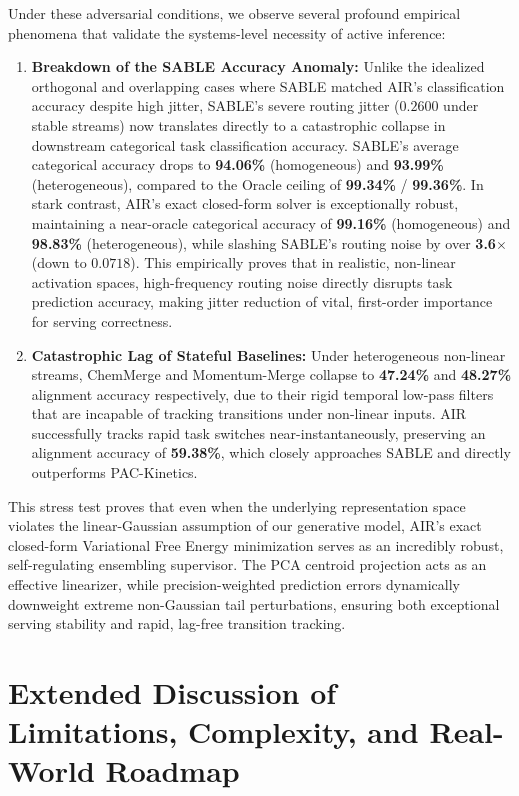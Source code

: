 \documentclass{article}
\theoremstyle{plain}
\theoremstyle{definition}
\theoremstyle{remark}
\begin{document}
Under these adversarial conditions, we observe several profound empirical phenomena that validate the systems-level necessity of active inference:
\begin{enumerate}
    \item \textbf{Breakdown of the SABLE Accuracy Anomaly:} Unlike the idealized orthogonal and overlapping cases where SABLE matched AIR's classification accuracy despite high jitter, SABLE's severe routing jitter ($0.2600$ under stable streams) now translates directly to a catastrophic collapse in downstream categorical task classification accuracy. SABLE's average categorical accuracy drops to \textbf{94.06\%} (homogeneous) and \textbf{93.99\%} (heterogeneous), compared to the Oracle ceiling of \textbf{99.34\%} / \textbf{99.36\%}. In stark contrast, AIR's exact closed-form solver is exceptionally robust, maintaining a near-oracle categorical accuracy of \textbf{99.16\%} (homogeneous) and \textbf{98.83\%} (heterogeneous), while slashing SABLE's routing noise by over \textbf{3.6$\times$} (down to $0.0718$). This empirically proves that in realistic, non-linear activation spaces, high-frequency routing noise directly disrupts task prediction accuracy, making jitter reduction of vital, first-order importance for serving correctness.
    \item \textbf{Catastrophic Lag of Stateful Baselines:} Under heterogeneous non-linear streams, ChemMerge and Momentum-Merge collapse to \textbf{47.24\%} and \textbf{48.27\%} alignment accuracy respectively, due to their rigid temporal low-pass filters that are incapable of tracking transitions under non-linear inputs. AIR successfully tracks rapid task switches near-instantaneously, preserving an alignment accuracy of \textbf{59.38\%}, which closely approaches SABLE and directly outperforms PAC-Kinetics.
\end{enumerate}
This stress test proves that even when the underlying representation space violates the linear-Gaussian assumption of our generative model, AIR's exact closed-form Variational Free Energy minimization serves as an incredibly robust, self-regulating ensembling supervisor. The PCA centroid projection acts as an effective linearizer, while precision-weighted prediction errors dynamically downweight extreme non-Gaussian tail perturbations, ensuring both exceptional serving stability and rapid, lag-free transition tracking.


\section{Extended Discussion of Limitations, Complexity, and Real-World Roadmap}
\label{app:extended_limitations}
\end{document}
